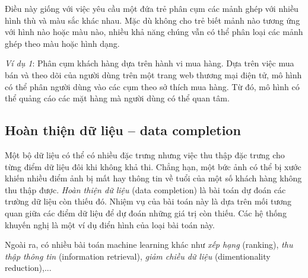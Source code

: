 Điều này giống với việc yêu cầu một đứa trẻ phân cụm các mảnh ghép với nhiều hình thù và màu sắc khác nhau. Mặc dù không cho trẻ biết mảnh nào tương ứng
với hình nào hoặc màu nào, nhiều khả năng chúng vẫn có thể phân loại các mảnh
ghép theo màu hoặc hình dạng.

\textit{Ví dụ 1}: Phân cụm khách hàng dựa trên hành vi mua hàng. Dựa trên việc mua bán và theo dõi của người dùng trên một trang web thương mại điện tử, mô hình có thể phân người dùng vào các cụm theo sở thích mua hàng. Từ đó, mô hình có thể quảng cáo các mặt hàng mà người dùng có thể quan tâm.


\subsection{Hoàn thiện dữ liệu -- data completion}
Một bộ dữ liệu có thể có nhiều đặc trưng nhưng việc thu thập đặc trưng cho từng
điểm dữ liệu đôi khi không khả thi. Chẳng hạn, một bức ảnh có thể bị xước khiến
nhiều điểm ảnh bị mất hay thông tin về tuổi của một số khách hàng không thu thập
được. \textit{Hoàn thiện dữ liệu} (data completion) là bài toán dự đoán các trường dữ liệu còn
thiếu đó. Nhiệm vụ của bài toán này là dựa trên mối tương quan giữa các điểm dữ
liệu để dự đoán những giá trị còn thiếu. Các hệ thống khuyến nghị là một ví dụ điển hình của loại bài toán này.

Ngoài ra, có nhiều bài toán machine learning khác như \textit{xếp hạng} (ranking), \textit{thu thập thông tin} (information retrieval), \textit{giảm chiều dữ liệu} (dimentionality reduction),...







